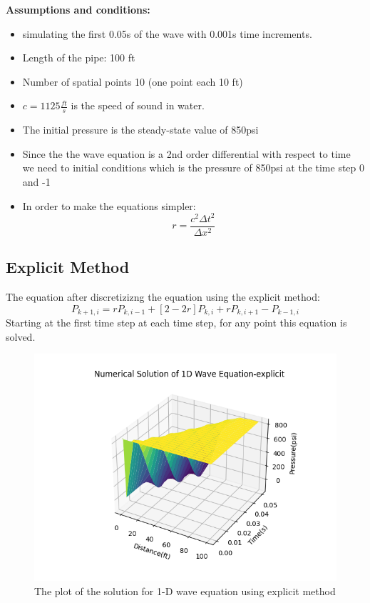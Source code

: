 \documentclass[12pt]{article}
\begin{document}
\textbf{Assumptions and conditions:}
\begin{itemize}
    \item simulating the first 0.05s of the wave with 0.001s time increments.
    \item Length of the pipe: 100 ft
    \item Number of spatial points 10 (one point each 10 ft)
    \item \( c = 1125  \frac{ft}{s} \) is the speed of sound in water.
    \item The initial pressure is the steady-state value of 850psi
    \item Since the the wave equation is a 2nd order differential with respect to time we need to initial conditions which is the pressure of 850psi at the time step 0 and -1
    \item  In order to make the equations simpler:
    \begin{equation}
    r = \frac{c^2 \Delta t^2}{\Delta x^2} 
    \end{equation}
\end{itemize}







\subsection{Explicit Method}\label{}
The equation after discretizizng the equation using the explicit method:
\begin{equation}
    P_{k+1,i} = r P_{k,i-1} + [2-2r] P_{k,i} + r P_{k,i+1} - P_{k-1,i} 
\end{equation}
Starting at the first time step at each time step, for any point this equation is solved.



\begin{figure}
\begin{center}
\includegraphics[width=\textwidth]{explicit_solution.png}
\caption{The plot of the solution for 1-D wave equation using explicit method}{}
\end{center}
\end{figure}
\end{document}
